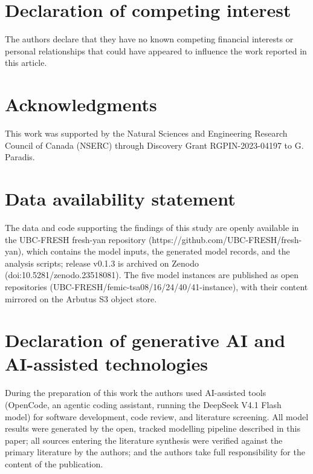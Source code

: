 \documentclass[preprint,12pt,authoryear]{elsarticle}
\begin{document}
\begin{linenumbers}
\section*{Declaration of competing interest}
\label{sec:Declaration of Competing Interest}
The authors declare that they have no known competing financial interests or personal relationships that could have appeared to influence the work reported in this article.

\section*{Acknowledgments}
\label{sec:acknowledgments}
This work was supported by the Natural Sciences and Engineering Research Council of Canada (NSERC) through Discovery Grant RGPIN-2023-04197 to G. Paradis.


\section*{Data availability statement}
\label{sec: data availability}
The data and code supporting the findings of this study are openly available in the UBC-FRESH fresh-yan repository (https://github.com/UBC-FRESH/fresh-yan), which contains the model inputs, the generated model records, and the analysis scripts; release v0.1.3 is archived on Zenodo (doi:10.5281/zenodo.23518081). The five model instances are published as open repositories (UBC-FRESH/femic-tsa08/16/24/40/41-instance), with their content mirrored on the Arbutus S3 object store. 

\section*{Declaration of generative AI and AI-assisted technologies}
During the preparation of this work the authors used AI-assisted tools (OpenCode, an agentic coding assistant, running the DeepSeek V4.1 Flash model) for software development, code review, and literature screening. All model results were generated by the open, tracked modelling pipeline described in this paper; all sources entering the literature synthesis were verified against the primary literature by the authors; and the authors take full responsibility for the content of the publication.
\end{linenumbers}
 


\end{document}
